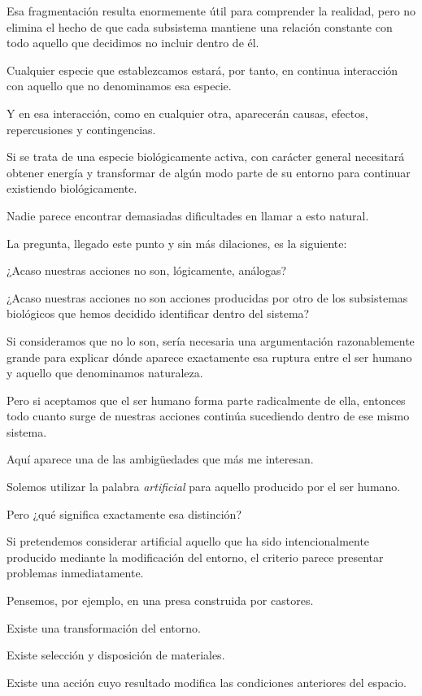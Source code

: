 \documentclass[12pt,a4paper]{article}
\begin{document}
Esa fragmentación resulta enormemente útil para comprender la realidad, pero no elimina el hecho de que cada subsistema mantiene una relación constante con todo aquello que decidimos no incluir dentro de él.

Cualquier especie que establezcamos estará, por tanto, en continua interacción con aquello que no denominamos esa especie.

Y en esa interacción, como en cualquier otra, aparecerán causas, efectos, repercusiones y contingencias.

Si se trata de una especie biológicamente activa, con carácter general necesitará obtener energía y transformar de algún modo parte de su entorno para continuar existiendo biológicamente.

Nadie parece encontrar demasiadas dificultades en llamar a esto natural.

La pregunta, llegado este punto y sin más dilaciones, es la siguiente:

¿Acaso nuestras acciones no son, lógicamente, análogas?

¿Acaso nuestras acciones no son acciones producidas por otro de los subsistemas biológicos que hemos decidido identificar dentro del sistema?

Si consideramos que no lo son, sería necesaria una argumentación razonablemente grande para explicar dónde aparece exactamente esa ruptura entre el ser humano y aquello que denominamos naturaleza.

Pero si aceptamos que el ser humano forma parte radicalmente de ella, entonces todo cuanto surge de nuestras acciones continúa sucediendo dentro de ese mismo sistema.

Aquí aparece una de las ambigüedades que más me interesan.

Solemos utilizar la palabra \emph{artificial} para aquello producido por el ser humano.

Pero ¿qué significa exactamente esa distinción?

Si pretendemos considerar artificial aquello que ha sido intencionalmente producido mediante la modificación del entorno, el criterio parece presentar problemas inmediatamente.

Pensemos, por ejemplo, en una presa construida por castores.

Existe una transformación del entorno.

Existe selección y disposición de materiales.

Existe una acción cuyo resultado modifica las condiciones anteriores del espacio.
\end{document}
